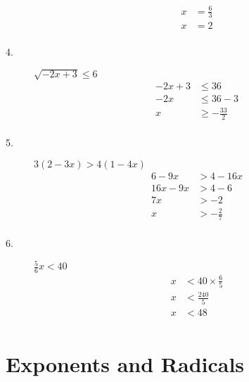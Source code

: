 \documentclass{article}
\begin{document}
\begin{description}
$$\begin{aligned}
                x                               & =\frac{6}{3}  \\
                x                               & =2            \\
            \end{aligned}
        $$
    \item[4. ]  $\sqrt{-2x+3} \le 6$
        $$
            \begin{aligned}
                -2x + 3 & \le 36            \\
                -2x     & \le 36-3          \\
                x       & \ge -\frac{33}{2} \\
            \end{aligned}
        $$
    \item[5. ]  $3(2-3x) > 4(1-4x)$
        $$
            \begin{aligned}
                6-9x   & > 4-16x        \\
                16x-9x & > 4-6          \\
                7x     & > -2           \\
                x      & > -\frac{2}{7} \\
            \end{aligned}
        $$
    \item[6. ]  $\frac{5}{6}x < 40$
        $$
            \begin{aligned}
                x & < 40 \times \frac{6}{5} \\
                x & < \frac{240}{5}         \\
                x & < 48                    \\
            \end{aligned}
        $$
\end{description}
\clearpage

\section*{\centering Exponents and Radicals}
\end{document}
